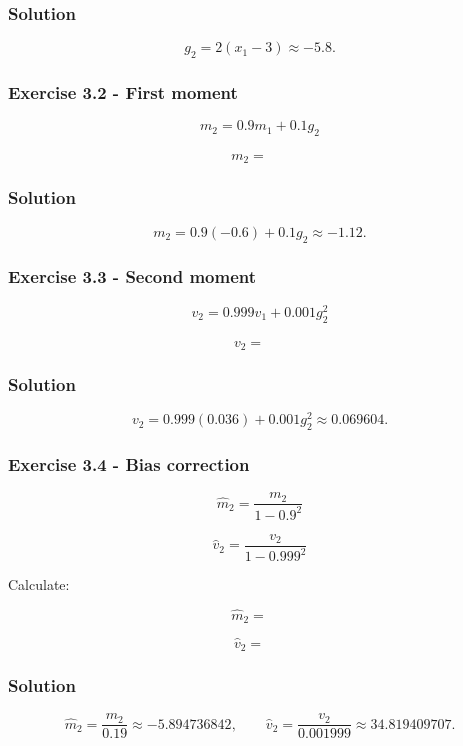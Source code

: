 \documentclass[10pt]{article}
\begin{document}
\begingroup\color{red}

\subsubsection*{Solution}
\[
g_2=2(x_1-3)\approx-5.8.
\]

\par\endgroup

\subsubsection*{Exercise 3.2 - First moment}
\[
m_2 = 0.9m_1+0.1g_2
\]

\[
m_2 = {\phantom{000}}
\]

\begingroup\color{red}

\subsubsection*{Solution}
\[
m_2=0.9(-0.6)+0.1g_2\approx-1.12.
\]

\par\endgroup

\subsubsection*{Exercise 3.3 - Second moment}
\[
v_2 = 0.999v_1+0.001g_2^2
\]

\[
v_2 = {\phantom{000}}
\]

\begingroup\color{red}

\subsubsection*{Solution}
\[
v_2=0.999(0.036)+0.001g_2^2\approx0.069604.
\]

\par\endgroup

\subsubsection*{Exercise 3.4 - Bias correction}
\[
\hat m_2 =
\frac{m_2}{1-0.9^2}
\]

\[
\hat v_2 =
\frac{v_2}{1-0.999^2}
\]

Calculate:

\[
\hat m_2 = {\phantom{000}}
\]

\[
\hat v_2 = {\phantom{000}}
\]

\begingroup\color{red}

\subsubsection*{Solution}
\[
\hat m_2=\frac{m_2}{0.19}\approx-5.894736842,\qquad\hat v_2=\frac{v_2}{0.001999}\approx34.819409707.
\]
\end{document}
